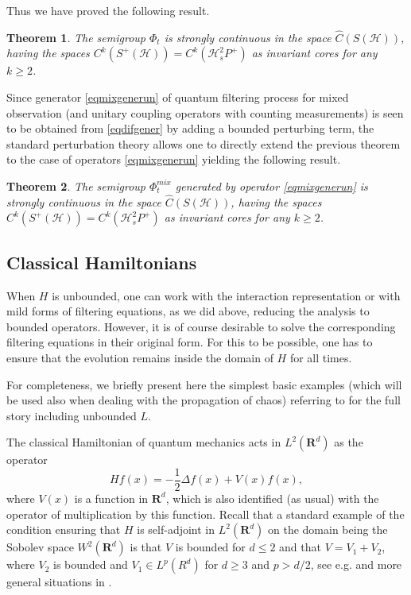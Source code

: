\documentclass[10pt,a4paper]{amsart}
\def\HC{\mathcal{H}}
\def\R{\mathbf{R}}
\newtheorem{theorem}{Theorem}[section]
\newcommand{\De}{\Delta}
\begin{document}
Thus we have proved the following result.

\begin{theorem}
\label{nonLinsdesem}
The semigroup $\Phi_t$ is strongly continuous in the space $\hat C(S(\HC))$, having the spaces
$C^k(S^+(\HC))=C^k(\HC^2_sP^+)$ as invariant cores for any $k\ge 2$.
\end{theorem}

Since generator \eqref{eqmixgenerun} of quantum filtering process for mixed observation (and unitary coupling
operators with counting measurements) is seen to be obtained from \eqref{eqdifgener} by adding a bounded perturbing
term, the standard perturbation theory allows one to directly extend the previous theorem to the case of operators
\eqref{eqmixgenerun}  yielding the following result.

\begin{theorem}
\label{nonLinsdesemmix}
The semigroup $\Phi_t^{mix}$ generated by operator \eqref{eqmixgenerun}
is strongly continuous in the space $\hat C(S(\HC))$, having the spaces
$C^k(S^+(\HC))=C^k(\HC^2_sP^+)$ as invariant cores for any $k\ge 2$.
\end{theorem}

\subsection{Classical Hamiltonians}

When $H$ is unbounded, one can work with the interaction representation
 or with mild forms of filtering equations,
as we did above, reducing the analysis to bounded operators. However, it is of course desirable to solve
the corresponding filtering equations in their original form. For this to be possible, one has to ensure that
the evolution remains inside the domain of $H$ for all times.

For completeness, we briefly present here the simplest basic examples (which will be used
also when dealing with the propagation of chaos) referring to \cite{Kol25b}
for the full story including unbounded $L$.

The classical Hamiltonian of quantum mechanics acts in $L^2(\R^d)$ as the operator
\[
Hf(x)=-\frac12 \De f(x) +V(x) f(x),
\]
where $V(x)$ is a function in $\R^d$, which is also identified (as usual) with the operator
of multiplication by this function.
Recall that a standard example of the condition ensuring that $H$ is self-adjoint
in $L^2(\R^d)$ on the domain being the Sobolev space $W^2(\R^d)$ is that $V$ is bounded
for $d\le 2$ and  that $V=V_1+V_2$,
where $V_2$ is bounded and $V_1\in L^p(R^d)$ for $d\ge 3$ and $p>d/2$, see e.g. \cite{ReedSimon}
and more general situations in \cite{Yajima}.
\end{document}
